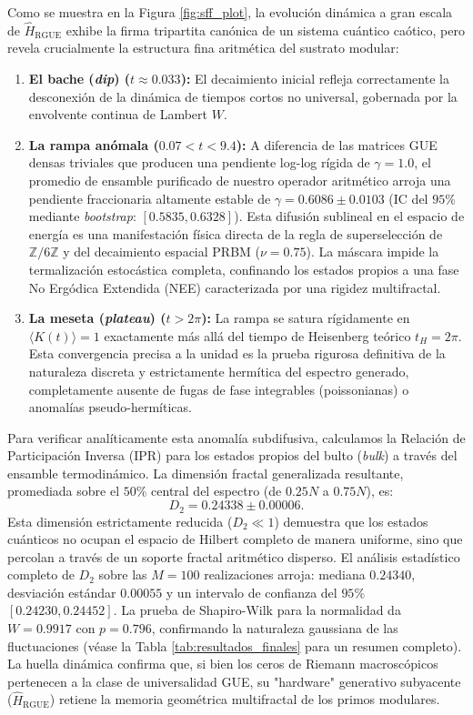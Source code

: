 \documentclass[aps,prl,preprint,superscriptaddress,floatfix]{revtex4-2}
\newcommand{\Zmod}{\mathbb{Z}/6\mathbb{Z}}
\begin{document}
Como se muestra en la Figura \ref{fig:sff_plot}, la evolución dinámica a gran escala de $\hat{H}_{\text{RGUE}}$ exhibe la firma tripartita canónica de un sistema cuántico caótico, pero revela crucialmente la estructura fina aritmética del sustrato modular:

\begin{enumerate}
    \item \textbf{El bache (\textit{dip}) ($t \approx 0.033$):} El decaimiento inicial refleja correctamente la desconexión de la dinámica de tiempos cortos no universal, gobernada por la envolvente continua de Lambert $W$.
    \item \textbf{La rampa anómala ($0.07 < t < 9.4$):} A diferencia de las matrices GUE densas triviales que producen una pendiente log-log rígida de $\gamma = 1.0$, el promedio de ensamble purificado de nuestro operador aritmético arroja una pendiente fraccionaria altamente estable de $\gamma = 0.6086 \pm 0.0103$ (IC del $95\%$ mediante \textit{bootstrap}: $[0.5835, 0.6328]$). Esta difusión sublineal en el espacio de energía es una manifestación física directa de la regla de superselección de $\Zmod$ y del decaimiento espacial PRBM ($\nu=0.75$). La máscara impide la termalización estocástica completa, confinando los estados propios a una fase No Ergódica Extendida (NEE) caracterizada por una rigidez multifractal.
    \item \textbf{La meseta (\textit{plateau}) ($t > 2\pi$):} La rampa se satura rígidamente en $\langle K(t) \rangle = 1$ exactamente más allá del tiempo de Heisenberg teórico $t_H = 2\pi$. Esta convergencia precisa a la unidad es la prueba rigurosa definitiva de la naturaleza discreta y estrictamente hermítica del espectro generado, completamente ausente de fugas de fase integrables (poissonianas) o anomalías pseudo-hermíticas.
\end{enumerate}

Para verificar analíticamente esta anomalía subdifusiva, calculamos la Relación de Participación Inversa (IPR) para los estados propios del bulto (\textit{bulk}) a través del ensamble termodinámico. La dimensión fractal generalizada resultante, promediada sobre el $50\%$ central del espectro (de $0.25N$ a $0.75N$), es:
\begin{equation}
D_2 = 0.24338 \pm 0.00006.
\end{equation}
Esta dimensión estrictamente reducida ($D_2 \ll 1$) demuestra que los estados cuánticos no ocupan el espacio de Hilbert completo de manera uniforme, sino que percolan a través de un soporte fractal aritmético disperso. El análisis estadístico completo de $D_2$ sobre las $M=100$ realizaciones arroja: mediana $0.24340$, desviación estándar $0.00055$ y un intervalo de confianza del $95\%$ $[0.24230, 0.24452]$. La prueba de Shapiro-Wilk para la normalidad da $W=0.9917$ con $p=0.796$, confirmando la naturaleza gaussiana de las fluctuaciones (véase la Tabla \ref{tab:resultados_finales} para un resumen completo). La huella dinámica confirma que, si bien los ceros de Riemann macroscópicos pertenecen a la clase de universalidad GUE, su "hardware" generativo subyacente ($\hat{H}_{\text{RGUE}}$) retiene la memoria geométrica multifractal de los primos modulares.
\end{document}
